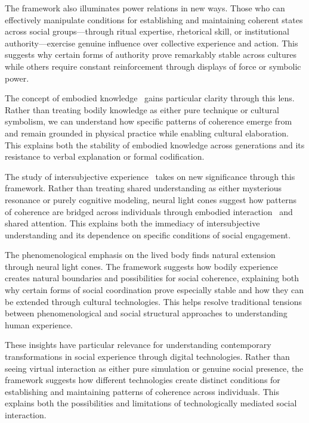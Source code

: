The framework also illuminates power relations in new ways. Those who can effectively manipulate conditions for establishing and maintaining coherent states across social groups—through ritual expertise, rhetorical skill, or institutional authority—exercise genuine influence over collective experience and action. This suggests why certain forms of authority prove remarkably stable across cultures while others require constant reinforcement through displays of force or symbolic power.

The concept of embodied knowledge~ gains particular clarity through this lens. Rather than treating bodily knowledge as either pure technique or cultural symbolism, we can understand how specific patterns of coherence emerge from and remain grounded in physical practice while enabling cultural elaboration. This explains both the stability of embodied knowledge across generations and its resistance to verbal explanation or formal codification.

The study of intersubjective experience~ takes on new significance through this framework. Rather than treating shared understanding as either mysterious resonance or purely cognitive modeling, neural light cones suggest how patterns of coherence are bridged across individuals through embodied interaction~ and shared attention. This explains both the immediacy of intersubjective understanding and its dependence on specific conditions of social engagement.

The phenomenological emphasis on the lived body finds natural extension through neural light cones. The framework suggests how bodily experience creates natural boundaries and possibilities for social coherence, explaining both why certain forms of social coordination prove especially stable and how they can be extended through cultural technologies. This helps resolve traditional tensions between phenomenological and social structural approaches to understanding human experience.

These insights have particular relevance for understanding contemporary transformations in social experience through digital technologies. Rather than seeing virtual interaction as either pure simulation or genuine social presence, the framework suggests how different technologies create distinct conditions for establishing and maintaining patterns of coherence across individuals. This explains both the possibilities and limitations of technologically mediated social interaction.


